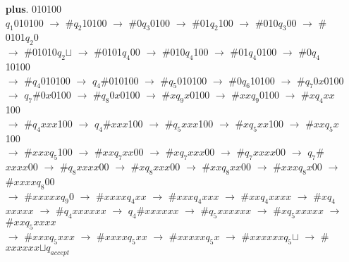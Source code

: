 \documentclass[12pt]{letter}
\begin{document}
\begin{enumerate}
\begin{enumerate}
\begin{enumerate}
\begin{center}
	\end{center}
		
	\item[\textbf{plus}.] 010100 \\
		$q_1$010100 $\rightarrow$ $\#$$q_2$10100 $\rightarrow$ $\#$0$q_3$0100 $\rightarrow$ $\#$01$q_2$100 $\rightarrow$ $\#$010$q_3$00 $\rightarrow$ $\#$0101$q_2$0\\
		$\rightarrow$ $\#$01010$q_2$$\sqcup$ $\rightarrow$ $\#$0101$q_4$00 $\rightarrow$ $\#$010$q_4$100 $\rightarrow$ $\#$01$q_4$0100 $\rightarrow$ $\#$0$q_4$10100 \\
		$\rightarrow$ $\#$$q_4$010100 $\rightarrow$ $q_4$$\#$010100 $\rightarrow$ $\#$$q_5$010100 $\rightarrow$ $\#$0$q_6$10100 $\rightarrow$ $\#$$q_7$0$x$0100 \\
		$\rightarrow$ $q_7$$\#$0$x$0100 $\rightarrow$ $\#$$q_8$0$x$0100 $\rightarrow$ $\#$$x$$q_9$$x$0100 $\rightarrow$ $\#$$xx$$q_9$0100 $\rightarrow$ $\#$$x$$q_4$$xx$100\\
		$\rightarrow$ $\#$$q_4$$xxx$100 $\rightarrow$ $q_4$$\#$$xxx$100 $\rightarrow$ $\#$$q_5$$xxx$100 $\rightarrow$ $\#$$x$$q_5$$xx$100 $\rightarrow$ $\#$$xx$$q_5$$x$100 \\
		$\rightarrow$ $\#$$xxx$$q_5$100 $\rightarrow$ $\#$$xx$$q_7$$xx$00 $\rightarrow$ $\#$$x$$q_7$$xxx$00 $\rightarrow$ $\#$$q_7$$xxxx$00 $\rightarrow$ $q_7$$\#$$xxxx$00 $\rightarrow$ $\#$$q_8$$xxxx$00 $\rightarrow$ $\#$$x$$q_8$$xxx$00 $\rightarrow$ $\#$$xx$$q_8$$xx$00 $\rightarrow$ $\#$$xxx$$q_8$$x$00 $\rightarrow$ $\#$$xxxx$$q_8$00 \\
		$\rightarrow$ $\#$$xxxxx$$q_9$0 $\rightarrow$ $\#$$xxxx$$q_4$$xx$ $\rightarrow$ $\#$$xxx$$q_4$$xxx$ $\rightarrow$ $\#$$xx$$q_4$$xxxx$ $\rightarrow$ $\#$$x$$q_4$$xxxxx$ $\rightarrow$ $\#$$q_4$$xxxxxx$ $\rightarrow$ $q_4$$\#$$xxxxxx$ $\rightarrow$ $\#$$q_5$$xxxxxx$ $\rightarrow$ $\#$$x$$q_5$$xxxxx$ $\rightarrow$ $\#$$xx$$q_5$$xxxx$ \\
		$\rightarrow$ $\#$$xxx$$q_5$$xxx$ $\rightarrow$ $\#$$xxxx$$q_5$$xx$ $\rightarrow$ $\#$$xxxxx$$q_5$$x$ $\rightarrow$ $\#$$xxxxxx$$q_5$$\sqcup$ $\rightarrow$ $\#$$xxxxxx$$\sqcup$$q_{accept}$\\
		

\end{enumerate}
\end{enumerate}
\end{enumerate}
\end{document}
